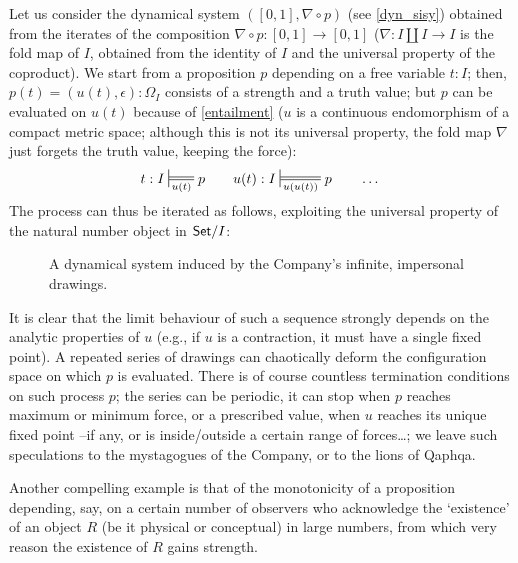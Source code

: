 \begin{example}
	Let us consider the dynamical system $([0,1],\nabla\circ p)$ (see \autoref{dyn_sisy}) obtained from the iterates of the composition $\nabla \circ p : [0,1] \to [0,1]$ ($\nabla : I\amalg I \to I$ is the fold map of $I$, obtained from the identity of $I$ and the universal property of the coproduct). We start from a proposition $p$ depending on a free variable $t : I$; then, $p(t) = (u(t),\epsilon): \Omega_I$ consists of a strength and a truth value; but $p$ can be evaluated on $u(t)$ because of \eqref{entailment} ($u$ is a continuous endomorphism of a compact metric space; although this is not its universal property, the fold map $\nabla$ just forgets the truth value, keeping the force):
	\[
		t : I\entails{u(t)} p \qquad u(t) :I \entails{u(u(t))} p \qquad \dots
	\]
	The process can thus be iterated as follows, exploiting the universal property of the natural number object in $\mathsf{Set}/I$:
	\begin{center}
		\begin{figure}[h]
			\def\line{\draw (0,0) -- (1,0); \draw (0,.5) -- (1,.5);}
			\caption{A dynamical system induced by the Company's infinite, impersonal drawings.}
			\label{fig_dynamics}
		\end{figure}
	\end{center}
	It is clear that the limit behaviour of such a sequence strongly depends on the analytic properties of $u$ (e.g., if $u$ is a contraction, it must have a single fixed point). A repeated series of drawings can chaotically deform the configuration space on which $p$ is evaluated. There is of course countless termination conditions on such process $p$; the series can be periodic, it can stop when $p$ reaches maximum or minimum force, or a prescribed value, when $u$ reaches its unique fixed point --if any, or is inside/outside a certain range of forces\dots; we leave such speculations to the mystagogues of the Company, or to the lions of Qaphqa.
\end{example}
Another compelling example is that of the monotonicity of a proposition depending, say, on a certain number of observers who acknowledge the `existence' of an object $R$ (be it physical or conceptual) in large numbers, from which very reason the existence of $R$ gains strength.
